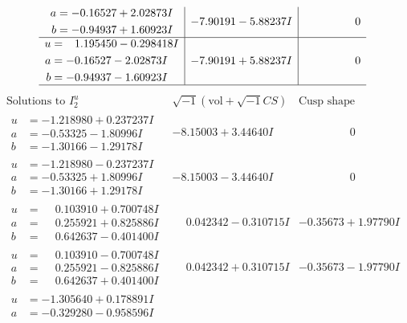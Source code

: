 \documentclass[1p]{elsarticle_modified}
\theoremstyle{definition}
\newcommand{\I}{\sqrt{-1}}
\begin{document}
$$\begin{array}{c|c|c}
\begin{aligned}
a &= -0.16527 + 2.02873 I \\
b &= -0.94937 + 1.60923 I\end{aligned}
 & -7.90191 - 5.88237 I & \phantom{-0.000000 } 0 \\ \hline\begin{aligned}
u &= \phantom{-}1.195450 - 0.298418 I \\
a &= -0.16527 - 2.02873 I \\
b &= -0.94937 - 1.60923 I\end{aligned}
 & -7.90191 + 5.88237 I & \phantom{-0.000000 } 0\\
 \hline 
 \end{array}$$\newpage$$\begin{array}{c|c|c}  
\text{Solutions to }I^u_{2}& \I (\text{vol} + \sqrt{-1}CS) & \text{Cusp shape}\\
 \hline 
\begin{aligned}
u &= -1.218980 + 0.237237 I \\
a &= -0.53325 - 1.80996 I \\
b &= -1.30166 - 1.29178 I\end{aligned}
 & -8.15003 + 3.44640 I & \phantom{-0.000000 } 0 \\ \hline\begin{aligned}
u &= -1.218980 - 0.237237 I \\
a &= -0.53325 + 1.80996 I \\
b &= -1.30166 + 1.29178 I\end{aligned}
 & -8.15003 - 3.44640 I & \phantom{-0.000000 } 0 \\ \hline\begin{aligned}
u &= \phantom{-}0.103910 + 0.700748 I \\
a &= \phantom{-}0.255921 + 0.825886 I \\
b &= \phantom{-}0.642637 - 0.401400 I\end{aligned}
 & \phantom{-}0.042342 - 0.310715 I & -0.35673 + 1.97790 I \\ \hline\begin{aligned}
u &= \phantom{-}0.103910 - 0.700748 I \\
a &= \phantom{-}0.255921 - 0.825886 I \\
b &= \phantom{-}0.642637 + 0.401400 I\end{aligned}
 & \phantom{-}0.042342 + 0.310715 I & -0.35673 - 1.97790 I \\ \hline\begin{aligned}
u &= -1.305640 + 0.178891 I \\
a &= -0.329280 - 0.958596 I \\

\end{aligned}
\end{array}$$
\end{document}
